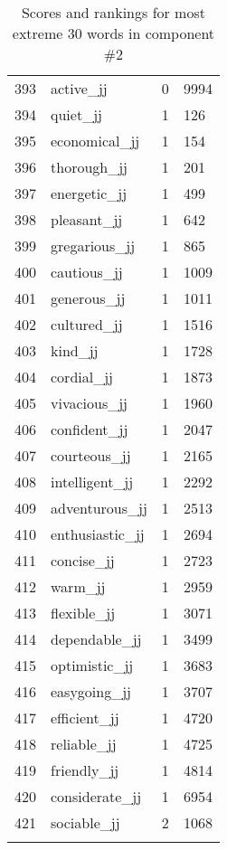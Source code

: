 \begin{longtable}[!htbp]{| rlr@{.}l |}
    393 & active\_jj & 0 & 9994 \\
    394 & quiet\_jj & 1 & 126 \\
    395 & economical\_jj & 1 & 154 \\
    396 & thorough\_jj & 1 & 201 \\
    397 & energetic\_jj & 1 & 499 \\
    398 & pleasant\_jj & 1 & 642 \\
    399 & gregarious\_jj & 1 & 865 \\
    400 & cautious\_jj & 1 & 1009 \\
    401 & generous\_jj & 1 & 1011 \\
    402 & cultured\_jj & 1 & 1516 \\
    403 & kind\_jj & 1 & 1728 \\
    404 & cordial\_jj & 1 & 1873 \\
    405 & vivacious\_jj & 1 & 1960 \\
    406 & confident\_jj & 1 & 2047 \\
    407 & courteous\_jj & 1 & 2165 \\
    408 & intelligent\_jj & 1 & 2292 \\
    409 & adventurous\_jj & 1 & 2513 \\
    410 & enthusiastic\_jj & 1 & 2694 \\
    411 & concise\_jj & 1 & 2723 \\
    412 & warm\_jj & 1 & 2959 \\
    413 & flexible\_jj & 1 & 3071 \\
    414 & dependable\_jj & 1 & 3499 \\
    415 & optimistic\_jj & 1 & 3683 \\
    416 & easygoing\_jj & 1 & 3707 \\
    417 & efficient\_jj & 1 & 4720 \\
    418 & reliable\_jj & 1 & 4725 \\
    419 & friendly\_jj & 1 & 4814 \\
    420 & considerate\_jj & 1 & 6954 \\
    421 & sociable\_jj & 2 & 1068 \\
    \hline
    \caption{Scores and rankings for most extreme 30 words in component \#2} \\
\end{longtable}
